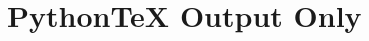 \documentclass{article}
\begin{document}
\section*{PythonTeX Output Only}

\begin{pyconsole}[file=1_preprocessing.py, showoutput]
\end{pyconsole}
\end{document}
